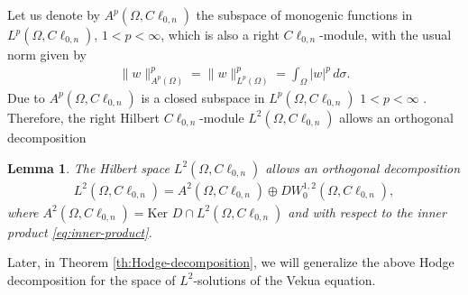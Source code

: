 \documentclass[12pt]{article}
\newtheorem{lemma}[theorem]{Lemma}
\def\H{\mathbb{H}}
\def\R{\mathbb{R}}
\begin{document}
Let us denote by $A^p(\Omega,C\ell_{0,n})$ the subspace of monogenic functions in $L^p(\Omega,C\ell_{0,n})$, $1<p<\infty$, which is also a right $C\ell_{0,n}$-module, with the usual norm given by
\begin{align*}
   \|w\|_{A^p(\Omega)}^p=\|w\|_{L^p(\Omega)}^p=\int_{\Omega}{|w|^p \, d\sigma}.
\end{align*}
Due to $A^p(\Omega,C\ell_{0,n})$ is a closed subspace in $L^p(\Omega, C\ell_{0,n})$ $1<p<\infty$ \cite[Prop.\ 3.73]{GuSpr1997}.
Therefore, the right Hilbert $C\ell_{0,n}$-module $L^2(\Omega, C\ell_{0,n})$ allows an orthogonal decomposition
\begin{lemma}\label{lemma:Hodge-monogenic}
\cite[Th.\ 1]{GurSpr1995}The Hilbert space $L^2(\Omega, C\ell_{0,n})$ allows an orthogonal decomposition
\begin{align}\label{eq:Hodge-1}
   L^2(\Omega, C\ell_{0,n})=A^2(\Omega,C\ell_{0,n})\oplus D W_0^{1,2}(\Omega,C\ell_{0,n}),
\end{align} 
where $A^2(\Omega,C\ell_{0,n})=\text{Ker }D\cap L^2(\Omega, C\ell_{0,n})$ and with respect to the inner product \eqref{eq:inner-product}.
\end{lemma}
Later, in Theorem \ref{th:Hodge-decomposition}, we will generalize the above Hodge decomposition for the space of $L^2$-solutions of the Vekua equation.
\end{document}
